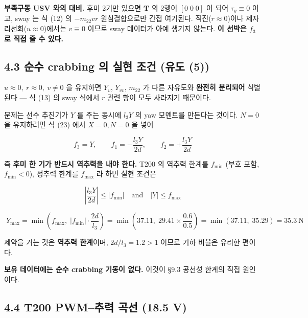 \documentclass[10pt,a4paper]{article}
\begin{document}
\textbf{부족구동 USV 와의 대비.} 후미 2기만 있으면 $\mathbf{T}$ 의 2행이 $[0\;0\;0]$ 이 되어 $\tau_y \equiv 0$ 이고, sway 는 식 (12) 의 $-m_{22}vr$ 원심결합으로만 간접 여기된다. 직진($r\approx0$)이나 제자리선회($u\approx0$)에서는 $v \equiv 0$ 이므로 sway 데이터가 아예 생기지 않는다. \textbf{이 선박은 $f_3$ 로 직접 줄 수 있다.}

\subsection*{4.3 순수 crabbing 의 실현 조건 (유도 (5))}

$u \approx 0,\ r \approx 0,\ v \neq 0$ 을 유지하면 $Y_v$, $Y_{vv}$, $m_{22}$ 가 다른 자유도와 \textbf{완전히 분리되어} 식별된다 --- 식 (13) 의 sway 식에서 $r$ 관련 항이 모두 사라지기 때문이다.

문제는 선수 추진기가 $Y$ 를 주는 동시에 $l_3 Y$ 의 yaw 모멘트를 만든다는 것이다. $N = 0$ 을 유지하려면 식 (23) 에서 $X = 0, N = 0$ 을 넣어

\begin{equation*}
f_3 = Y, \qquad f_1 = -\frac{l_3 Y}{2d}, \qquad f_2 = +\frac{l_3 Y}{2d} \tag{25}
\end{equation*}

즉 \textbf{후미 한 기가 반드시 역추력을 내야 한다.} T200 의 역추력 한계를 $f_{\min}$ (부호 포함, $f_{\min} < 0$), 정추력 한계를 $f_{\max}$ 라 하면 실현 조건은

\begin{equation*}
\left|\frac{l_3 Y}{2d}\right| \le |f_{\min}|
\quad\text{and}\quad
|Y| \le f_{\max} \tag{26}
\end{equation*}

\begin{equation*}
\boxed{\;
Y_{\max} = \min\!\left(f_{\max},\; |f_{\min}|\cdot\frac{2d}{l_3}\right)
= \min\!\left(37.11,\; 29.41 \times \frac{0.6}{0.5}\right)
= \min(37.11,\; 35.29) = 35.3\ \text{N}
\;} \tag{27}
\end{equation*}

제약을 거는 것은 \textbf{역추력 한계}이며, $2d/l_3 = 1.2 > 1$ 이므로 기하 비율은 유리한 편이다.

\textbf{보유 데이터에는 순수 crabbing 기동이 없다.} 이것이 \S{}9.3 공선성 한계의 직접 원인이다.

\subsection*{4.4 T200 PWM--추력 곡선 (18.5 V)}
\end{document}
